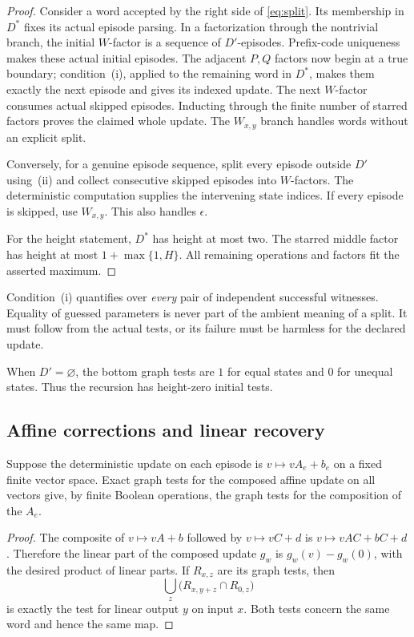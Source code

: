 \begin{proof}
Consider a word accepted by the right side of \eqref{eq:split}. Its membership
in \(D^*\) fixes its actual episode parsing. In a factorization through the
nontrivial branch, the initial \(W\)-factor is a sequence of \(D'\)-episodes.
Prefix-code uniqueness makes these actual initial episodes. The adjacent
\(P,Q\) factors now begin at a true boundary; condition~(i), applied to the
remaining word in \(D^*\), makes them exactly the next episode and gives its
indexed update. The next \(W\)-factor consumes actual skipped episodes.
Inducting through the finite number of starred factors proves the claimed
whole update. The \(W_{x,y}\) branch handles words without an explicit split.

Conversely, for a genuine episode sequence, split every episode outside \(D'\)
using~(ii) and collect consecutive skipped episodes into \(W\)-factors.
The deterministic computation supplies the intervening state indices.
If every episode is skipped, use \(W_{x,y}\). This also handles \(\epsilon\).

For the height statement, \(D^*\) has height at most two. The starred middle
factor has height at most \(1+\max\{1,H\}\). All remaining operations and
factors fit the asserted maximum.
\end{proof}

Condition~(i) quantifies over \emph{every} pair of independent successful
witnesses. Equality of guessed parameters is never part of the ambient
meaning of a split. It must follow from the actual tests, or its failure must
be harmless for the declared update.

When \(D'=\varnothing\), the bottom graph tests are \(1\) for equal states and
\(0\) for unequal states. Thus the recursion has height-zero initial tests.

\subsection{Affine corrections and linear recovery}

\begin{lemma}\label{lem:affine-recovery}
Suppose the deterministic update on each episode is
\(v\mapsto vA_e+b_e\) on a fixed finite vector space. Exact graph tests for
the composed affine update on all vectors give, by finite Boolean operations,
the graph tests for the composition of the \(A_e\).
\end{lemma}

\begin{proof}
The composite of \(v\mapsto vA+b\) followed by \(v\mapsto vC+d\) is
\(v\mapsto vAC+bC+d\). Therefore the linear part of the composed update
\(g_w\) is \(g_w(v)-g_w(0)\), with the desired product of linear parts.
If \(R_{x,z}\) are its graph tests, then
\[
          \bigcup_z\bigl(R_{x,y+z}\cap R_{0,z}\bigr)
\]
is exactly the test for linear output \(y\) on input \(x\).
Both tests concern the same word and hence the same map.
\end{proof}

